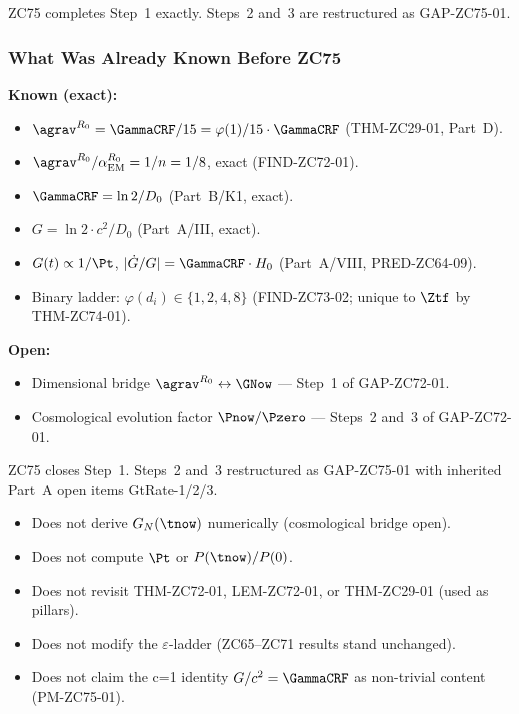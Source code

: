 \documentclass[12pt, a4paper]{article}
\renewcommand{\aEM}{\alpha_{\rm EM}}
\begin{document}
ZC75 completes Step~1 exactly.
Steps~2 and~3 are restructured as GAP-ZC75-01.

\subsubsection{What Was Already Known Before ZC75}

\begin{keybox}[title={Pre-ZC75 Status of Gravity Bridge}]
\textbf{Known (exact):}
\begin{itemize}[leftmargin=2em, noitemsep]
  \item $\agrav^{R_0} = \GammaCRF/15 = \varphi(1)/15 \cdot \GammaCRF$
    (THM-ZC29-01, Part~D).
  \item $\agrav^{R_0}/\aEM^{R_0} = 1/n = 1/8$, exact
    (FIND-ZC72-01).
  \item $\GammaCRF = \ln2/D_0$ (Part~B/K1, exact).
  \item $G = \ln2 \cdot c^2/D_0$ (Part~A/III, exact).
  \item $G(t) \propto 1/\Pt$, $|\dot{G}/G| = \GammaCRF \cdot H_0$
    (Part~A/VIII, PRED-ZC64-09).
  \item Binary ladder: $\varphi(d_i) \in \{1,2,4,8\}$
    (FIND-ZC73-02; unique to $\Ztf$ by THM-ZC74-01).
\end{itemize}

\textbf{Open:}
\begin{itemize}[leftmargin=2em, noitemsep]
  \item Dimensional bridge $\agrav^{R_0} \leftrightarrow \GNow$
    --- Step~1 of GAP-ZC72-01.
  \item Cosmological evolution factor $\Pnow/\Pzero$
    --- Steps~2 and~3 of GAP-ZC72-01.
\end{itemize}

ZC75 closes Step~1.
Steps~2 and~3 restructured as GAP-ZC75-01 with inherited
Part~A open items GtRate-1/2/3.
\end{keybox}

\begin{keybox}[title={What ZC75 Does NOT Do}]
\begin{itemize}[leftmargin=2em, noitemsep]
  \item Does not derive $G_N(\tnow)$ numerically (cosmological bridge open).
  \item Does not compute $\Pt$ or $P(\tnow)/P(0)$.
  \item Does not revisit THM-ZC72-01, LEM-ZC72-01, or
    THM-ZC29-01 (used as pillars).
  \item Does not modify the $\varepsilon$-ladder (ZC65--ZC71 results stand unchanged).
  \item Does not claim the c=1 identity $G/c^2 = \GammaCRF$
    as non-trivial content (PM-ZC75-01).
\end{itemize}
\end{keybox}
\end{document}
